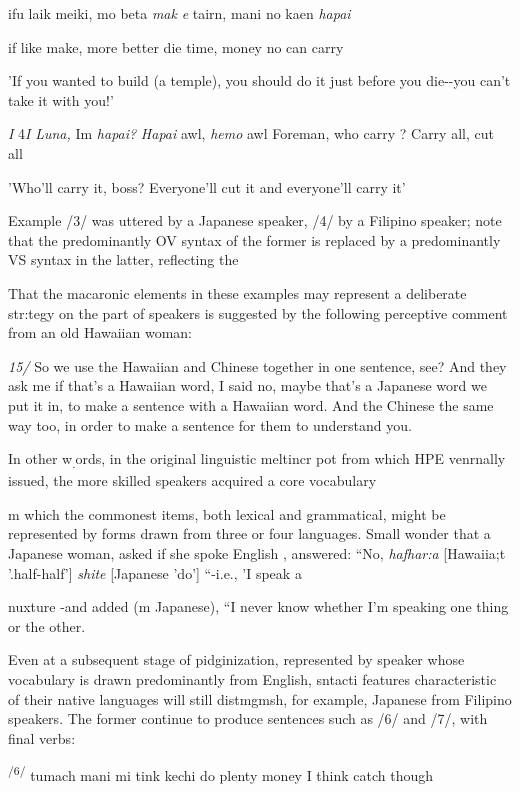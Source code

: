 \ea\label{ex:3}
ifu laik meiki, mo beta \textit{mak} \textit{e} tairn, mani no kaen \textit{hapai}
\glt
\z

if like make, more better die time, money no can carry

'If you wanted to build (a temple), you should do it just before you die-{}-you can't take it with you!'

\textit{I} 4\textit{I }\textit{Luna,} Im \textit{hapai?} \textit{Hapai} awl, \textit{hemo} awl Foreman, who carry ? Carry all, cut all

'Who'll carry it, boss? Everyone'll cut it and everyone'll carry it'

Example /3/ was uttered by a Japanese speaker, /4/ by a Filipino speaker; note that the predominantly OV syntax of the former is replaced by a predominantly VS syntax in the latter, reflecting the

That the macaronic elements in these examples may represent a deliber\-ate str:tegy on the part of speakers is suggested by the following perceptive comment from an old Hawaiian woman:

\textit{15/} So we use the Hawaiian and Chinese together in one sentence, see? And they ask me if that's a Hawaiian word, I said no, maybe that's a Japanese word we put it in, to make a sentence with a Hawaiian word. And the Chinese the same way too, in order to make a sentence for them to understand you.

In other w\textsubscript{.}ords, in the original linguistic meltincr pot from which HPE venrnally issued, the more skilled speakers acquired a core vocabulary

m which the commonest items, both lexical and grammatical, might be represented by forms drawn from three or four languages. Small won\-der that a Japanese woman, asked if she spoke English , answered: ``No, \textit{haf{\textquotedbl}{\textquotedbl}har:a} [Hawaiia;t '.half-half'] \textit{shite} [Japanese 'do'] ``{}-i.e., 'I speak a

nuxture {}-and added (m Japanese), ``I never know whether I'm speaking one thing or the other.{\textquotedbl}

Even at a subsequent stage of pidginization, represented by speaker whose vocabulary is drawn predominantly from English, sntacti features characteristic of their native languages will still distmgmsh, for example, Japanese from Filipino speakers. The former continue to produce sentences such as /6/ and /7/, with final verbs:

\textsuperscript{/6/ }tumach mani mi tink kechi do plenty money I think catch though

